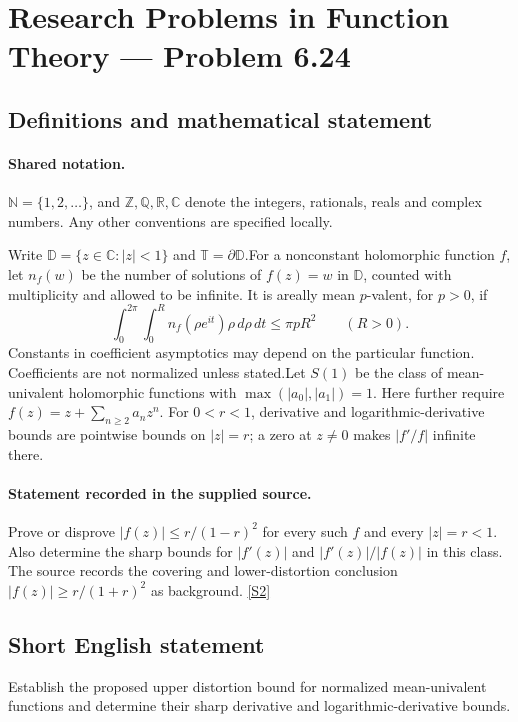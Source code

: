 \documentclass[11pt]{article}
\newcommand{\sref}[2]{\hyperlink{source:#1:#2}{[S#2]}}
\begin{document}
\section{Research Problems in Function Theory — Problem 6.24}\label{statement}

\subsection{Definitions and mathematical statement}

\paragraph{Shared notation.}$\mathbb N=\{1,2,\ldots\}$, and $\mathbb Z,\mathbb Q,\mathbb R,\mathbb C$ denote the integers, rationals, reals and complex numbers. Any other conventions are specified locally.


Write $\mathbb D=\{z\in\mathbb C:|z|<1\}$ and $\mathbb T=\partial\mathbb D$.For a nonconstant holomorphic function $f$, let $n_f(w)$ be the number of solutions of $f(z)=w$ in $\mathbb D$, counted with multiplicity and allowed to be infinite. It is areally mean $p$-valent, for $p>0$, if
\[\int_0^{2\pi}\int_0^R n_f(\rho e^{it})\rho\,d\rho\,dt\le\pi pR^2\qquad(R>0).\]
Constants in coefficient asymptotics may depend on the particular function. Coefficients are not normalized unless stated.Let $S(1)$ be the class of mean-univalent holomorphic functions with $\max(|a_0|,|a_1|)=1$. Here further require $f(z)=z+\sum_{n\ge2}a_nz^n$. For $0<r<1$, derivative and logarithmic-derivative bounds are pointwise bounds on $|z|=r$; a zero at $z\ne0$ makes $|f'/f|$ infinite there.
\paragraph{Statement recorded in the supplied source.}
Prove or disprove $|f(z)|\le r/(1-r)^2$ for every such $f$ and every $|z|=r<1$. Also determine the sharp bounds for $|f'(z)|$ and $|f'(z)|/|f(z)|$ in this class. The source records the covering and lower-distortion conclusion $|f(z)|\ge r/(1+r)^2$ as background. \sref{statement}{2}
\subsection{Short English statement}
Establish the proposed upper distortion bound for normalized mean-univalent functions and determine their sharp derivative and logarithmic-derivative bounds.
\end{document}
